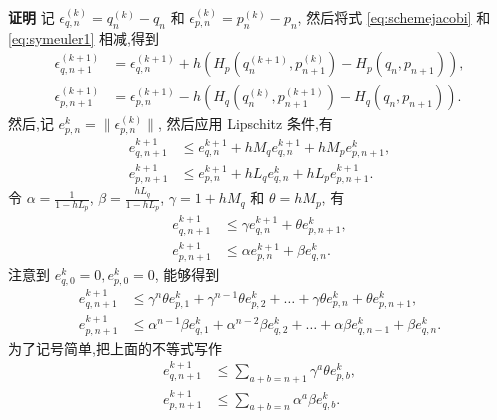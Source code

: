 {\textbf{证明}} 记 $\epsilon_{q,n}^{(k)}=q_{n}^{(k)}-q_{n}$ 和 $\epsilon_{p,n}^{(k)}=p_{n}^{(k)}-p_{n}$, 然后将式 \eqref{eq:schemejacobi} 和 \eqref{eq:symeuler1} 相减,得到
  \begin{equation*}
    \begin{aligned}
      \epsilon_{q,n+1}^{(k+1)}&=\epsilon_{q,n}^{(k+1)}+h(H_{p}(q_{n}^{(k+1)},p_{n+1}^{(k)})-H_{p}(q_{n},p_{n+1})),\\
      \epsilon_{p,n+1}^{(k+1)}&=\epsilon_{p,n}^{(k+1)}-h(H_{q}(q_{n}^{(k)},p_{n+1}^{(k+1)})-H_{q}(q_{n},p_{n+1})).
    \end{aligned}
  \end{equation*}
  然后,记 $e_{p,n}^{k}=\|\epsilon_{p,n}^{(k)}\|$, 然后应用 Lipschitz 条件,有
  \begin{equation*}
    \begin{aligned}
      e_{q,n+1}^{k+1}&\le e_{q,n}^{k+1}+hM_{q}e_{q,n}^{k+1}+hM_{p}e_{p,n+1}^{k},\\
      e_{p,n+1}^{k+1}&\le e_{p,n}^{k+1}+hL_{q}e_{q,n}^{k}+hL_{p}e_{p,n+1}^{k+1}.
    \end{aligned}
  \end{equation*}
  令 $\alpha=\frac{1}{1-hL_{p}}$, $\beta=\frac{hL_{q}}{1-hL_{p}}$, $\gamma=1+hM_{q}$ 和 $\theta=hM_{p}$, 有
  \begin{equation*}
    \begin{aligned}
      e_{q,n+1}^{k+1}&\le \gamma e_{q,n}^{k+1}+\theta e_{p,n+1}^{k},\\
      e_{p,n+1}^{k+1}&\le \alpha e_{p,n}^{k+1}+\beta e_{q,n}^{k}.
    \end{aligned}
  \end{equation*}
  注意到 $e_{q,0}^{k}=0, e_{p,0}^{k}=0$, 能够得到
  \begin{equation*}
    \begin{aligned}
      e_{q,n+1}^{k+1}&\le \gamma^{n}\theta e_{p,1}^{k}+\gamma^{n-1}\theta e_{p,2}^{k}+\ldots+\gamma \theta e_{p,n}^{k}+\theta e_{p,n+1}^{k},\\
      e_{p,n+1}^{k+1}&\le \alpha^{n-1}\beta e_{q,1}^{k}+\alpha^{n-2}\beta e_{q,2}^{k}+\ldots+\alpha \beta
      e_{q,n-1}^{k}+\beta e_{q,n}^{k}.
    \end{aligned}
  \end{equation*}
  为了记号简单,把上面的不等式写作
  \begin{equation*}
    \begin{aligned}
      e_{q,n+1}^{k+1}&\le \sum_{a+b=n+1}\gamma^{a}\theta e_{p,b}^{k},\\
      e_{p,n+1}^{k+1}&\le \sum_{a+b=n}\alpha^{a}\beta e_{q,b}^{k}.
    \end{aligned}
  \end{equation*}
